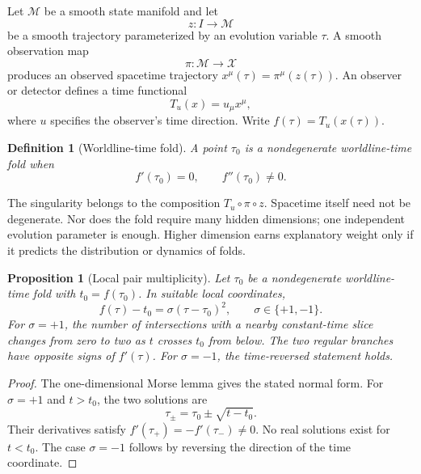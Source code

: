 \documentclass[aps,prd,reprint,nofootinbib,longbibliography]{revtex4-2}
\newtheorem{proposition}{Proposition}
\newtheorem{definition}{Definition}
\newcommand{\M}{\mathcal{M}}
\newcommand{\X}{\mathcal{X}}
\begin{document}
Let $\M$ be a smooth state manifold and let
\begin{equation}
  z:I\rightarrow\M
\end{equation}
be a smooth trajectory parameterized by an evolution variable $\tau$.  A smooth
observation map
\begin{equation}
  \pi:\M\rightarrow\X
\end{equation}
produces an observed spacetime trajectory $x^\mu(\tau)=\pi^\mu(z(\tau))$.  An
observer or detector defines a time functional
\begin{equation}
  T_u(x)=u_\mu x^\mu,
\end{equation}
where $u$ specifies the observer's time direction.  Write
$f(\tau)=T_u(x(\tau))$.

\begin{definition}[Worldline-time fold]
A point $\tau_0$ is a nondegenerate worldline-time fold when
\begin{equation}
  f'(\tau_0)=0,
  \qquad
  f''(\tau_0)\neq 0.
\end{equation}
\end{definition}

The singularity belongs to the composition $T_u\circ\pi\circ z$.  Spacetime itself
need not be degenerate.  Nor does the fold require many hidden dimensions; one
independent evolution parameter is enough.  Higher dimension earns explanatory
weight only if it predicts the distribution or dynamics of folds.

\begin{proposition}[Local pair multiplicity]
Let $\tau_0$ be a nondegenerate worldline-time fold with
$t_0=f(\tau_0)$.  In suitable local coordinates,
\begin{equation}
  f(\tau)-t_0=\sigma(\tau-\tau_0)^2,
  \qquad \sigma\in\{+1,-1\}.
\end{equation}
For $\sigma=+1$, the number of intersections with a nearby constant-time slice
changes from zero to two as $t$ crosses $t_0$ from below.  The two regular
branches have opposite signs of $f'(\tau)$.  For $\sigma=-1$, the time-reversed
statement holds.
\end{proposition}

\begin{proof}
The one-dimensional Morse lemma gives the stated normal form.  For
$\sigma=+1$ and $t>t_0$, the two solutions are
\begin{equation}
  \tau_\pm=\tau_0\pm\sqrt{t-t_0}.
\end{equation}
Their derivatives satisfy
$f'(\tau_+)=-f'(\tau_-)\neq0$.  No real solutions exist for $t<t_0$.  The
case $\sigma=-1$ follows by reversing the direction of the time coordinate.
\end{proof}
\end{document}
